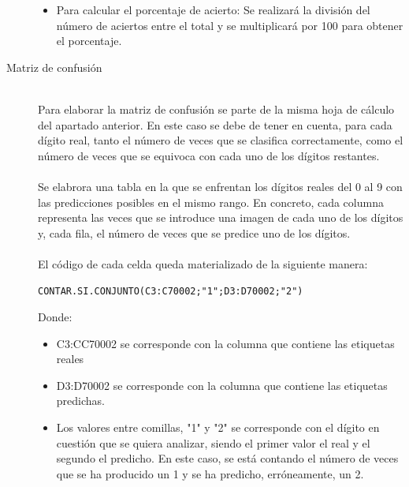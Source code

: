 \begin{description}
\begin{itemize}
{	}
	\item{Para calcular el porcentaje de acierto: Se realizará la división del número de aciertos entre el total y se multiplicará por 100 para obtener el porcentaje.
	}
	\end{itemize}
	\vspace{5pt}
	\item[Matriz de confusión] \hfill 
	\vspace{5pt}
	\\
	Para elaborar la matriz de confusión se parte de la misma hoja de cálculo del apartado anterior. En este caso se debe de tener en cuenta, para cada dígito real, tanto el número de veces que se clasifica correctamente, como el número de veces que se equivoca con cada uno de los dígitos restantes.\\
	\vspace{-10pt}
	\\
	Se elabrora una tabla en la que se enfrentan los dígitos reales del 0 al 9 con las predicciones posibles en el mismo rango. En concreto, cada columna representa las veces que se introduce una imagen de cada uno de los dígitos y, cada fila, el número de veces que se predice uno de los dígitos.\\
	\vspace{-10pt}
	\\
	El código de cada celda queda materializado de la siguiente manera:
	\vspace{10pt}
	\begin{lstlisting}[frame=single]
	CONTAR.SI.CONJUNTO(C3:C70002;"1";D3:D70002;"2")
	\end{lstlisting}
	Donde:
	\begin{itemize}
		\item C3:CC70002 se corresponde con la columna que contiene las etiquetas reales
		\item D3:D70002 se corresponde con la columna que contiene las etiquetas predichas.
		\item Los valores entre comillas, "1" y "2" se corresponde con el dígito en cuestión que se quiera analizar, siendo el primer valor el real y el segundo el predicho. En este caso, se está contando el número de veces que se ha producido un 1 y se ha predicho, erróneamente, un 2.
	\end{itemize}
	

\end{description}
